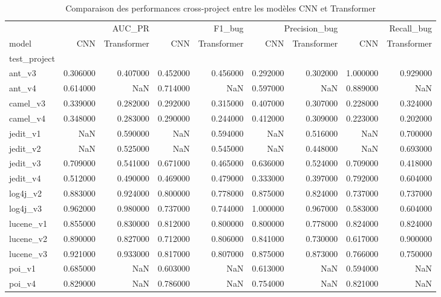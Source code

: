 \begin{table}
\caption{Comparaison des performances cross-project entre les modèles CNN et Transformer}
\label{tab:cnn_vs_transformer}
\begin{tabular}{lrrrrrrrr}
\toprule
 & \multicolumn{2}{r}{AUC_PR} & \multicolumn{2}{r}{F1_bug} & \multicolumn{2}{r}{Precision_bug} & \multicolumn{2}{r}{Recall_bug} \\
model & CNN & Transformer & CNN & Transformer & CNN & Transformer & CNN & Transformer \\
test_project &  &  &  &  &  &  &  &  \\
\midrule
ant_v3 & 0.306000 & 0.407000 & 0.452000 & 0.456000 & 0.292000 & 0.302000 & 1.000000 & 0.929000 \\
ant_v4 & 0.614000 & NaN & 0.714000 & NaN & 0.597000 & NaN & 0.889000 & NaN \\
camel_v3 & 0.339000 & 0.282000 & 0.292000 & 0.315000 & 0.407000 & 0.307000 & 0.228000 & 0.324000 \\
camel_v4 & 0.348000 & 0.283000 & 0.290000 & 0.244000 & 0.412000 & 0.309000 & 0.223000 & 0.202000 \\
jedit_v1 & NaN & 0.590000 & NaN & 0.594000 & NaN & 0.516000 & NaN & 0.700000 \\
jedit_v2 & NaN & 0.525000 & NaN & 0.545000 & NaN & 0.448000 & NaN & 0.693000 \\
jedit_v3 & 0.709000 & 0.541000 & 0.671000 & 0.465000 & 0.636000 & 0.524000 & 0.709000 & 0.418000 \\
jedit_v4 & 0.512000 & 0.490000 & 0.469000 & 0.479000 & 0.333000 & 0.397000 & 0.792000 & 0.604000 \\
log4j_v2 & 0.883000 & 0.924000 & 0.800000 & 0.778000 & 0.875000 & 0.824000 & 0.737000 & 0.737000 \\
log4j_v3 & 0.962000 & 0.980000 & 0.737000 & 0.744000 & 1.000000 & 0.967000 & 0.583000 & 0.604000 \\
lucene_v1 & 0.855000 & 0.830000 & 0.812000 & 0.800000 & 0.800000 & 0.778000 & 0.824000 & 0.824000 \\
lucene_v2 & 0.890000 & 0.827000 & 0.712000 & 0.806000 & 0.841000 & 0.730000 & 0.617000 & 0.900000 \\
lucene_v3 & 0.921000 & 0.933000 & 0.817000 & 0.807000 & 0.875000 & 0.873000 & 0.766000 & 0.750000 \\
poi_v1 & 0.685000 & NaN & 0.603000 & NaN & 0.613000 & NaN & 0.594000 & NaN \\
poi_v4 & 0.829000 & NaN & 0.786000 & NaN & 0.754000 & NaN & 0.821000 & NaN \\

\end{tabular}
\end{table}
